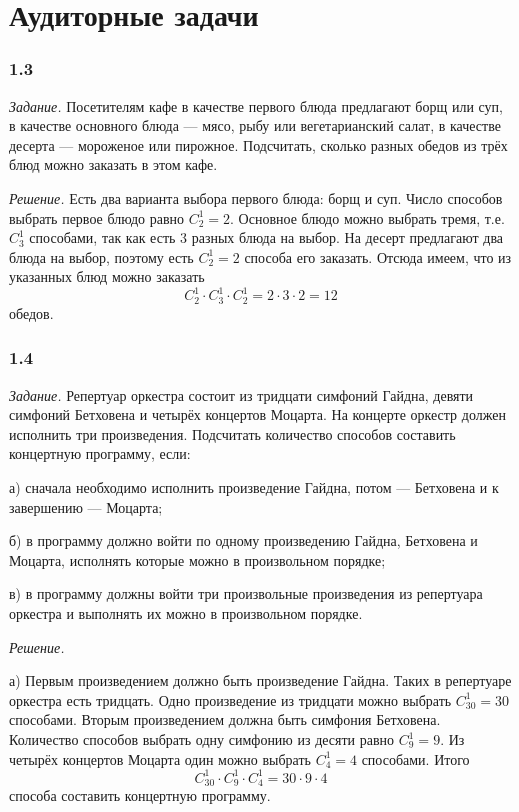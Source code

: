 \documentclass{book}
\begin{document}
\section*{Аудиторные задачи}

\subsubsection*{1.3}

\textit{Задание.} Посетителям кафе в качестве первого блюда предлагают борщ или суп, в качестве основного блюда --- мясо, рыбу или вегетарианский салат, в качестве десерта --- мороженое или пирожное. Подсчитать, сколько разных обедов из трёх блюд можно заказать в этом кафе.

\textit{Решение.} Есть два варианта выбора первого блюда: борщ и суп. Число способов выбрать первое блюдо равно $C_2^1=2$. Основное блюдо можно выбрать тремя, т.е. $C_3^1$ способами, так как есть 3 разных блюда на выбор. На десерт предлагают два блюда на выбор, поэтому есть $C_2^1=2$ способа его заказать. Отсюда имеем, что из указанных блюд можно заказать $$C_2^1\cdot C_3^1\cdot C_2^1=2\cdot 3\cdot 2=12$$ обедов.

\subsubsection*{1.4}

\textit{Задание.} Репертуар оркестра состоит из тридцати симфоний Гайдна, девяти симфоний Бетховена и четырёх концертов Моцарта. На концерте оркестр должен исполнить три произведения. Подсчитать количество способов составить концертную программу, если:

а) сначала необходимо исполнить произведение Гайдна, потом --- Бетховена и к завершению --- Моцарта;

б) в программу должно войти по одному произведению Гайдна, Бетховена и Моцарта, исполнять которые можно в произвольном порядке;

в) в программу должны войти три произвольные произведения из репертуара оркестра и выполнять их можно в произвольном порядке.

\textit{Решение.} 

а) Первым произведением должно быть произведение Гайдна. Таких в репертуаре оркестра есть тридцать. Одно произведение из тридцати можно выбрать $C_{30}^1=30$ способами. Вторым произведением должна быть симфония Бетховена. Количество способов выбрать одну симфонию из десяти равно $C_9^1=9$. Из четырёх концертов Моцарта один можно выбрать $C_4^1=4$ способами. Итого $$C_{30}^1\cdot C_9^1\cdot C_4^1=30\cdot 9\cdot 4$$ способа составить концертную программу.
\end{document}
